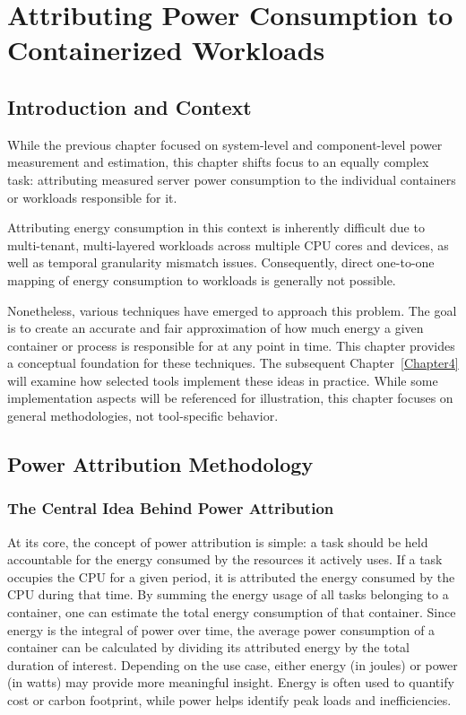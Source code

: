\chapter{Attributing Power Consumption to Containerized Workloads} %
\label{Chapter3}

\section{Introduction and Context}

While the previous chapter focused on system-level and component-level power measurement and estimation, this chapter shifts focus to an equally complex task: attributing measured server power consumption to the individual containers or workloads responsible for it.

Attributing energy consumption in this context is inherently difficult due to multi-tenant, multi-layered workloads across multiple CPU cores and devices, as well as temporal granularity mismatch issues. Consequently, direct one-to-one mapping of energy consumption to workloads is generally not possible.

Nonetheless, various techniques have emerged to approach this problem. The goal is to create an accurate and fair approximation of how much energy a given container or process is responsible for at any point in time. This chapter provides a conceptual foundation for these techniques. The subsequent Chapter~\ref{Chapter4} will examine how selected tools implement these ideas in practice. While some implementation aspects will be referenced for illustration, this chapter focuses on general methodologies, not tool-specific behavior.

\section{Power Attribution Methodology}

\subsection{The Central Idea Behind Power Attribution}

At its core, the concept of power attribution is simple: a task should be held accountable for the energy consumed by the resources it actively uses. If a task occupies the CPU for a given period, it is attributed the energy consumed by the CPU during that time. By summing the energy usage of all tasks belonging to a container, one can estimate the total energy consumption of that container. Since energy is the integral of power over time, the average power consumption of a container can be calculated by dividing its attributed energy by the total duration of interest. Depending on the use case, either energy (in joules) or power (in watts) may provide more meaningful insight. Energy is often used to quantify cost or carbon footprint, while power helps identify peak loads and inefficiencies.

